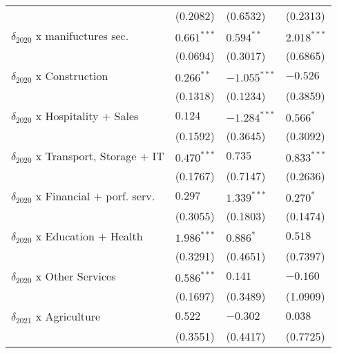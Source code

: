 \begin{tabular}{llll}
                                                   &           (0.2082) &           (0.6532) &           (0.2313) \\
$\delta_{2020}$ x manifuctures sec.                &      $0.661^{***}$ &       $0.594^{**}$ &      $2.018^{***}$ \\
                                                   &           (0.0694) &           (0.3017) &           (0.6865) \\
$\delta_{2020}$ x Construction                     &       $0.266^{**}$ &     $-1.055^{***}$ &           $-0.526$ \\
                                                   &           (0.1318) &           (0.1234) &           (0.3859) \\
$\delta_{2020}$ x Hospitality + Sales              &            $0.124$ &     $-1.284^{***}$ &          $0.566^*$ \\
                                                   &           (0.1592) &           (0.3645) &           (0.3092) \\
$\delta_{2020}$ x Transport, Storage + IT          &      $0.470^{***}$ &            $0.735$ &      $0.833^{***}$ \\
                                                   &           (0.1767) &           (0.7147) &           (0.2636) \\
$\delta_{2020}$ x Financial + porf. serv.          &            $0.297$ &      $1.339^{***}$ &          $0.270^*$ \\
                                                   &           (0.3055) &           (0.1803) &           (0.1474) \\
$\delta_{2020}$ x Education + Health               &      $1.986^{***}$ &          $0.886^*$ &            $0.518$ \\
                                                   &           (0.3291) &           (0.4651) &           (0.7397) \\
$\delta_{2020}$ x Other Services                   &      $0.586^{***}$ &            $0.141$ &           $-0.160$ \\
                                                   &           (0.1697) &           (0.3489) &           (1.0909) \\
$\delta_{2021}$ x Agriculture                      &            $0.522$ &           $-0.302$ &            $0.038$ \\
                                                   &           (0.3551) &           (0.4417) &           (0.7725) \\

\end{tabular}
